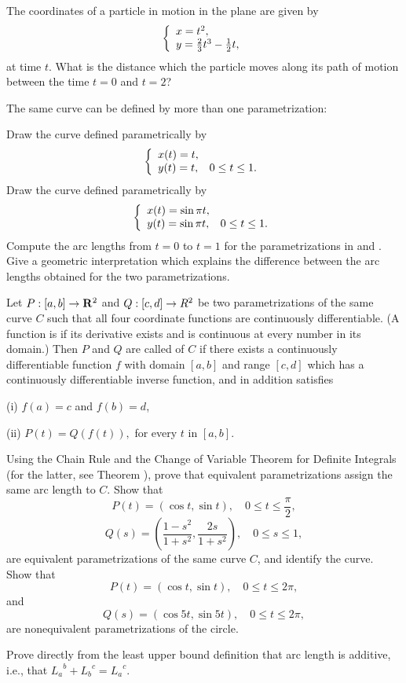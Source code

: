\begin{exercises}
The coordinates of a particle in motion
in the plane are given by
\[
\left\{ \begin{array}{ll} x=t^2, \\ y = \frac23 t^3 - \frac12 t, \end{array} \right.
\]
at time $t$.  What is the distance which the particle
moves along its path of motion between the
time $t=0$ and $t=2$?

The same curve can be defined by
more than one parametrization:
\begin{exenum}
\x
{}
Draw the curve defined parametrically by
\[
\left\{ \begin{array}{ll} x(t) = t, \\ y(t) = t, & 0 \leq t \leq 1. \end{array} \right.
\]
\x
{}
Draw the curve defined parametrically by
\[
\left\{ \begin{array}{ll} x(t) = \sin\pi t, \\ y(t) = \sin\pi t, & 0 \leq t \leq 1. \end{array} \right.
\]
\x
Compute the arc lengths from $t=0$ to $t=1$
for the parametrizations in 
and .
\x
Give a geometric interpretation which explains
the difference between the arc lengths
obtained for the two parametrizations.
\end{exenum}

Let $P:[a,b] \rightarrow \mathrm{\bf R}^2$ and $Q:[c,d]\rightarrow R^2$
be two parametrizations of the same curve
$C$ such that all four coordinate functions
are continuously differentiable.
(A function is 
if its derivative exists and is continuous at
every number in its domain.)
Then $P$ and $Q$ are called
 of $C$
if there exists a continuously differentiable
function $f$ with domain $[a,b]$ and range $[c,d]$
which has a continuously differentiable inverse
function, and in addition satisfies

(i) $f(a) = c$ and $f(b) = d$,

(ii) $P(t) = Q(f(t)),$ for every $t$ in $[a,b]$.

\begin{exenum}
\x
Using the Chain Rule and the Change of Variable
Theorem for Definite Integrals
(for the latter, see Theorem ),
prove that equivalent parametrizations assign
the same arc length to $C$.
\x
Show that
\[
P(t) = (\cos t, \sin t), \quad 0 \leq t \leq \frac{\pi}2
,
\]
\[
Q(s) = \left( \frac{1-s^2}{1+s^2},
\frac{2s}{1+s^2}\right), \quad 0 \leq s \leq 1
,
\]
are equivalent parametrizations of the same curve
$C$, and identify the curve.
\x
Show that
\[
P(t) = (\cos t, \sin t), \quad 0 \leq t \leq 2\pi
,
\]
and
\[
Q(s) = (\cos 5t, \sin 5t), \quad 0 \leq t \leq 2\pi
,
\]
are nonequivalent parametrizations of the circle.
\end{exenum}

Prove directly from the least upper bound definition
that arc length is additive,
i.e., that ${L_a}^b + {L_b}^c = {L_a}^c$.

\end{exercises}
